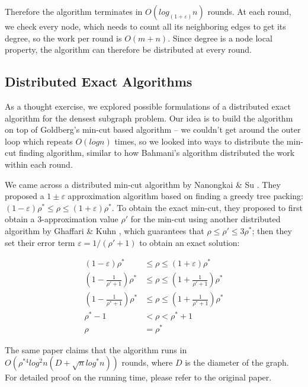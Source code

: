 \documentclass{article}
\begin{document}
Therefore the algorithm terminates in $O(log_{(1+\varepsilon)}n)$ rounds. At each round, we check every node, which needs to count all its neighboring edges to get its degree, so the work per round is $O(m+n)$. Since degree is a node local property, the algorithm can therefore be distributed at every round.

\subsection{Distributed Exact Algorithms}
As a thought exercise, we explored possible formulations of a distributed exact algorithm for the densest subgraph problem. Our idea is to build the algorithm on top of Goldberg's min-cut based algorithm – we couldn't get around the outer loop which repeats $O(logn)$ times, so we looked into ways to distribute the min-cut finding algorithm, similar to how Bahmani's algorithm distributed the work within each round.

We came across a distributed min-cut algorithm by Nanongkai \& Su \cite{DBLP:journals/corr/NanongkaiS14}. They proposed a $1 \pm \varepsilon$ approximation algorithm based on finding a greedy tree packing: $(1 - \varepsilon) \rho^* \leq \rho \leq (1 + \varepsilon) \rho^*$. To obtain the exact min-cut, they proposed to first obtain a 3-approximation value $\rho'$ for the min-cut using another distributed algorithm by Ghaffari \& Kuhn \cite{DBLP:journals/corr/abs-1305-5520}, which guarantees that $\rho \leq \rho' \leq 3\rho^*$; then they set their error term $\varepsilon = 1/(\rho'+1)$ to obtain an exact solution:

\begin{equation}
  \begin{split}
      (1 - \varepsilon) \rho^* & \leq \rho \leq (1 + \varepsilon) \rho^* \\
      (1 - \frac{1}{\rho' + 1}) \rho^* & \leq \rho \leq (1 + \frac{1}{\rho' + 1}) \rho^* \\
      (1 - \frac{1}{\rho^* + 1}) \rho^* & \leq \rho \leq (1 + \frac{1}{\rho^* + 1}) \rho^* \\
      \rho^* - 1 & < \rho < \rho^* + 1 \\
      \rho & = \rho^*
  \end{split}
\end{equation}

The same paper claims that the algorithm runs in $O(\rho^{*4} log^2n (D + \sqrt{n} log^*n))$ rounds, where $D$ is the diameter of the graph. For detailed proof on the running time, please refer to the original paper.
\end{document}
